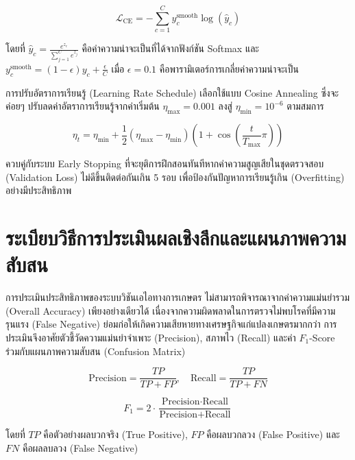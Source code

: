 \begin{equation}
    \mathcal{L}_{\text{CE}} = -\sum_{c=1}^{C} y_{c}^{\text{smooth}} \log(\hat{y}_c)
\end{equation}

\noindent โดยที่ $\hat{y}_c = \frac{e^{z_c}}{\sum_{j=1}^C e^{z_j}}$ คือค่าความน่าจะเป็นที่ได้จากฟังก์ชัน Softmax และ $y_c^{\text{smooth}} = (1 - \epsilon) y_c + \frac{\epsilon}{C}$ เมื่อ $\epsilon = 0.1$ คือพารามิเตอร์การเกลี่ยค่าความน่าจะเป็น

การปรับอัตราการเรียนรู้ (Learning Rate Schedule) เลือกใช้แบบ Cosine Annealing ซึ่งจะค่อยๆ ปรับลดค่าอัตราการเรียนรู้จากค่าเริ่มต้น $\eta_{\text{max}} = 0.001$ ลงสู่ $\eta_{\text{min}} = 10^{-6}$ ตามสมการ

\begin{equation}
    \eta_t = \eta_{\text{min}} + \frac{1}{2}(\eta_{\text{max}} - \eta_{\text{min}})\left(1 + \cos\left(\frac{t}{T_{\text{max}}}\pi\right)\right)
\end{equation}

\noindent ควบคู่กับระบบ Early Stopping ที่จะยุติการฝึกสอนทันทีหากค่าความสูญเสียในชุดตรวจสอบ (Validation Loss) ไม่ดีขึ้นติดต่อกันเกิน 5 รอบ เพื่อป้องกันปัญหาการเรียนรู้เกิน (Overfitting) อย่างมีประสิทธิภาพ

\section{ระเบียบวิธีการประเมินผลเชิงลึกและแผนภาพความสับสน}

การประเมินประสิทธิภาพของระบบวิชันเอไอทางการเกษตร ไม่สามารถพิจารณาจากค่าความแม่นยำรวม (Overall Accuracy) เพียงอย่างเดียวได้ เนื่องจากความผิดพลาดในการตรวจไม่พบโรคที่มีความรุนแรง (False Negative) ย่อมก่อให้เกิดความเสียหายทางเศรษฐกิจแก่แปลงเกษตรมากกว่า การประเมินจึงอาศัยตัวชี้วัดความแม่นยำจำเพาะ (Precision), สภาพไว (Recall) และค่า $F_1$-Score ร่วมกับแผนภาพความสับสน (Confusion Matrix)

\begin{equation}
    \text{Precision} = \frac{TP}{TP + FP}, \quad \text{Recall} = \frac{TP}{TP + FN}
\end{equation}

\begin{equation}
    F_1 = 2 \cdot \frac{\text{Precision} \cdot \text{Recall}}{\text{Precision} + \text{Recall}}
\end{equation}

\noindent โดยที่ $TP$ คือตัวอย่างผลบวกจริง (True Positive), $FP$ คือผลบวกลวง (False Positive) และ $FN$ คือผลลบลวง (False Negative)

